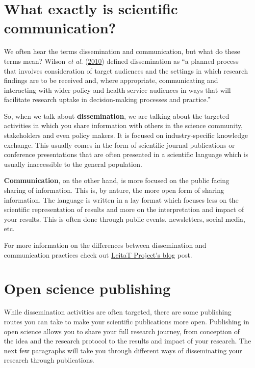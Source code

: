 \documentclass[
]{book}
\begin{document}
\hypertarget{what-exactly-is-scientific-communication}{%
\section{What exactly is scientific communication?}\label{what-exactly-is-scientific-communication}}

We often hear the terms dissemination and communication, but what do these terms mean? Wilson \emph{et al.} (\href{https://www.ncbi.nlm.nih.gov/pmc/articles/PMC2994786/}{2010}) defined dissemination as ``a planned process that involves consideration of target audiences and the settings in which research findings are to be received and, where appropriate, communicating and interacting with wider policy and health service audiences in ways that will facilitate research uptake in decision-making processes and practice.''

So, when we talk about \textbf{dissemination}, we are talking about the targeted activities in which you share information with others in the science community, stakeholders and even policy makers. It is focused on industry-specific knowledge exchange. This usually comes in the form of scientific journal publications or conference presentations that are often presented in a scientific language which is usually inaccessible to the general population.

\textbf{Communication}, on the other hand, is more focused on the public facing sharing of information. This is, by nature, the more open form of sharing information. The language is written in a lay format which focuses less on the scientific representation of results and more on the interpretation and impact of your results. This is often done through public events, newsletters, social media, etc.

For more information on the differences between dissemination and communication practices check out \href{https://projects.leitat.org/communication-vs-dissemination-whats-the-difference/}{LeitaT Project's blog} post.

\hypertarget{open-science-publishing}{%
\section{Open science publishing}\label{open-science-publishing}}

While dissemination activities are often targeted, there are some publishing routes you can take to make your scientific publications more open. Publishing in open science allows you to share your full research journey, from conception of the idea and the research protocol to the results and impact of your research. The next few paragraphs will take you through different ways of disseminating your research through publications.
\end{document}
